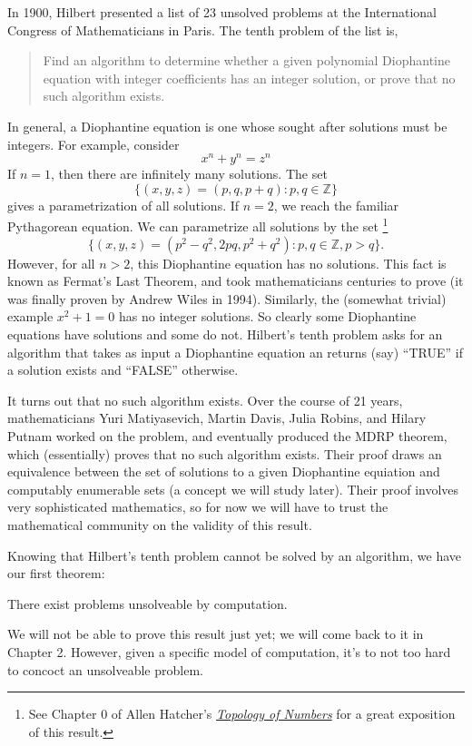 \documentclass[english, 12pt]{article}
\begin{document}
  In 1900, Hilbert presented a list of 23 unsolved problems at the
  International Congress of Mathematicians in Paris. The tenth problem
  of the list is,
  \begin{quote}
      Find an algorithm to determine whether a given polynomial Diophantine 
      equation with integer coefficients has an integer solution, or prove
      that no such algorithm exists.
  \end{quote}
  In general, a Diophantine equation is one whose sought after solutions must
  be integers. For example, consider
  \[ x^n + y^n = z^n \]
  If $n = 1$, then there are infinitely many solutions. The set 
  \[ \{(x, y, z) = (p, q, p + q) : p, q \in \mathbb{Z}\} \] gives a
  parametrization of all solutions. If $n = 2$, we reach the familiar
  Pythagorean equation. We can parametrize all solutions by the set
  \footnote{See Chapter 0 of Allen Hatcher's {\it 
  \href{http://www.math.cornell.edu/~hatcher/TN/TNpage.html}
       {Topology of Numbers} } for a great exposition of this result.}
  \[ \{ (x, y, z) = (p^2 - q^2, 2pq, p^2 + q^2) : p, q \in \mathbb{Z}, p > q
  \}. \]
  However, for all $n > 2$, this Diophantine equation has no solutions. This
  fact is known as Fermat's Last Theorem, and took mathematicians centuries
  to prove (it was finally proven by Andrew Wiles in 1994). Similarly, the
  (somewhat trivial) example \(x^2 + 1 = 0\) has no integer solutions. So 
  clearly some Diophantine equations have solutions and some do not.
  Hilbert's tenth problem asks for an algorithm that takes as input a 
  Diophantine equation an returns (say) ``TRUE'' if a solution exists and
  ``FALSE'' otherwise. \n

  It turns out that no such algorithm exists. Over the course of 21 years,
  mathematicians Yuri Matiyasevich, Martin Davis, Julia Robins, and Hilary
  Putnam worked on the problem, and eventually produced the MDRP theorem,
  which (essentially) proves that no such algorithm exists. Their proof 
  draws an equivalence between the set of solutions to a given Diophantine
  equiation and computably enumerable sets (a concept we will study later).
  Their proof involves very sophisticated mathematics, so for now we will
  have to trust the mathematical community on the validity of this result.
  \n

  Knowing that Hilbert's tenth problem cannot be solved by an algorithm,
  we have our first theorem:
  \begin{thrm}
      There exist problems unsolveable by computation.
  \end{thrm}
  We will not be able to prove this result just yet; we will come back to
  it in Chapter 2. However, given a specific model of computation, it's to
  not too hard to concoct an unsolveable problem.
\end{document}
